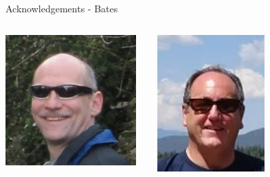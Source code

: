 \documentclass[aspectratio=169]{beamer}
\begin{document}
\begin{frame}{Acknowledgements - Bates}
    \begin{columns}
        \centering
        \centering
            
            \includegraphics[width=0.95\textwidth]{people/bates/jim.png}
            
        \centering
                
            \includegraphics[width=0.95\textwidth]{people/bates/ernie.png}
        \centering
            

\end{columns}
\end{frame}
\end{document}
